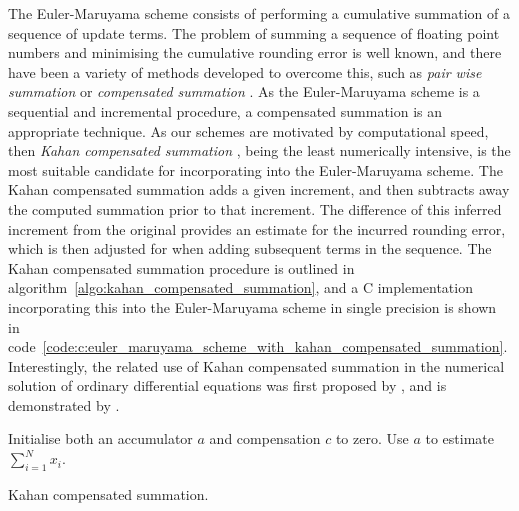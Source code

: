 \documentclass[manuscript,review]{acmart}
\begin{document}
The Euler-Maruyama scheme consists of performing a cumulative summation of a sequence of update terms. The problem of summing a sequence of floating point numbers and minimising the cumulative rounding error is well known, and there have been a variety of methods developed to overcome this, such as \emph{pair wise summation} or \emph{compensated summation} \citep[4.1]{higham2002accuracy}. As the Euler-Maruyama scheme is a sequential and incremental procedure, a compensated summation is an appropriate technique. As our schemes are motivated by computational speed, then \emph{Kahan compensated summation} \citep{kahan1965further}, being the least numerically intensive, is the most suitable candidate for incorporating into the Euler-Maruyama scheme. The Kahan compensated summation adds a given increment, and then subtracts away the computed summation prior to that increment. The difference of this inferred increment from the original provides an estimate for the incurred rounding error, which is then adjusted for when adding subsequent terms in the sequence. The Kahan compensated summation procedure is outlined in algorithm~\ref{algo:kahan_compensated_summation}, and a C implementation incorporating this into the Euler-Maruyama scheme in single precision is shown in code~\ref{code:c:euler_maruyama_scheme_with_kahan_compensated_summation}. Interestingly, the related use of Kahan compensated summation in the numerical solution of ordinary differential equations was first proposed by \citet{vitasek1969numerical}, and is demonstrated by \citet[pages~86--87]{higham1993accuracy}.

\begin{algorithm}[htb]
\DontPrintSemicolon
{}
Initialise both an accumulator $ a $ and compensation $ c $ to zero.\;
Use $ a $ to estimate $ \sum_{i=1}^{N} x_i $.\;
\caption[Kahan compensated summation ]{Kahan compensated summation.}
\label{algo:kahan_compensated_summation}
\end{algorithm}
\end{document}
